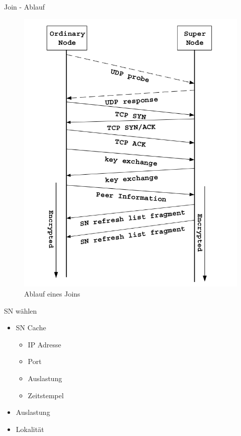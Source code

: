 \documentclass[ucs,9pt]{beamer}
\begin{document}
\begin{frame}{Join - Ablauf}
\begin{figure}
\includegraphics[scale=0.25]{images/join}
\caption{Ablauf eines Joins}
\end{figure}
\end{frame}

\begin{frame}{SN wählen}
\begin{itemize}
\item SN Cache
\begin{itemize}
\item IP Adresse
\item Port
\item Auslastung
\item Zeitstempel
\end{itemize}
\end{itemize}
\begin{itemize}
\item Auslastung
\item Lokalität
\end{itemize}
\end{frame}
\end{document}
